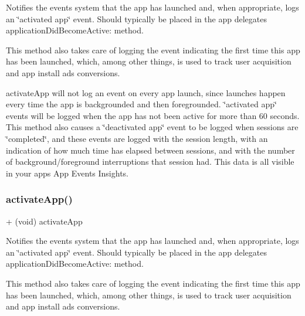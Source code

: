 Notifies the events system that the app has launched and, when appropriate, logs an \char`\"{}activated app\char`\"{} event. Should typically be placed in the app delegates\textquotesingle{} {\ttfamily application\+Did\+Become\+Active\+:} method.

This method also takes care of logging the event indicating the first time this app has been launched, which, among other things, is used to track user acquisition and app install ads conversions.

{\ttfamily activate\+App} will not log an event on every app launch, since launches happen every time the app is backgrounded and then foregrounded. \char`\"{}activated app\char`\"{} events will be logged when the app has not been active for more than 60 seconds. This method also causes a \char`\"{}deactivated app\char`\"{} event to be logged when sessions are \char`\"{}completed\char`\"{}, and these events are logged with the session length, with an indication of how much time has elapsed between sessions, and with the number of background/foreground interruptions that session had. This data is all visible in your app\textquotesingle{}s App Events Insights. \mbox{\label{interfaceFBAppEvents_a440fe60c1685ab36053ba18a190dd82e}} 
\subsubsection{\texorpdfstring{activate\+App()}{activateApp()}\hspace{0.1cm}{\footnotesize\ttfamily [3/5]}}
{\footnotesize\ttfamily + (void) activate\+App \begin{DoxyParamCaption}{ }\end{DoxyParamCaption}}

Notifies the events system that the app has launched and, when appropriate, logs an \char`\"{}activated app\char`\"{} event. Should typically be placed in the app delegates\textquotesingle{} {\ttfamily application\+Did\+Become\+Active\+:} method.

This method also takes care of logging the event indicating the first time this app has been launched, which, among other things, is used to track user acquisition and app install ads conversions.

